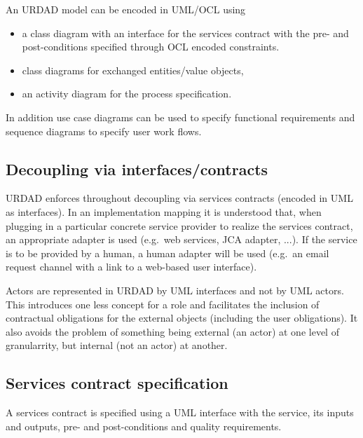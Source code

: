 An URDAD model can be encoded in UML/OCL using
\begin{itemize}
  \item a class diagram with an interface for the services contract with the pre- and post-conditions specified through
	 OCL encoded constraints.
  \item class diagrams for exchanged entities/value objects,
  \item an activity diagram for the process specification.
\end{itemize}

In addition use case diagrams can be used to specify functional requirements and sequence diagrams to 
specify user work flows.


\subsection{Decoupling via interfaces/contracts}

URDAD enforces throughout decoupling via services contracts (encoded in UML as interfaces). In an implementation
mapping it is understood that, when plugging in a particular concrete service provider to realize the services contract,
an appropriate adapter is used (e.g.\ web services, JCA adapter, ...). If the service is to be provided by a human, a human
adapter will be used (e.g.\ an email request channel with a link to a web-based user interface).

Actors are represented in URDAD by UML interfaces and not by UML actors. This introduces one less concept for a role 
and facilitates the inclusion of contractual obligations for the external objects (including the user obligations). It also
avoids the problem of something being external (an actor) at one level of granularrity, but internal (not an actor) at another.


\subsection{Services contract specification}

A services contract is specified using a UML interface with the service, its inputs and outputs, pre- and
post-conditions and quality requirements. 

